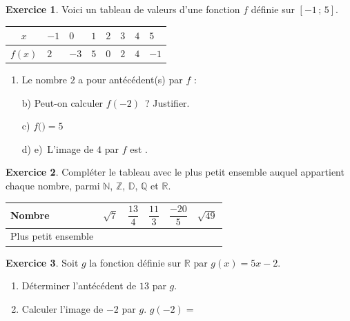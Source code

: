 \documentclass[12pt]{exam}
\theoremstyle{definition}
\newtheorem{exercice}{Exercice}
\newcommand{\pt}[1][2.5cm]{\makebox[#1]{\dotfill}}
\newcommand{\entete}[2]{%
\noindent{%
\textbf{\Niveau}\hfill\textbf{\Chapitre}\hfill\textbf{\Document\ (#1) -- #2}%
}\par
}
\begin{document}
\entete{C}{15 min}
\vspace{2mm}
\vspace{3mm}
\begin{exercice}
Voici un tableau de valeurs d'une fonction $f$ définie sur $[-1\,;\,5]$.
\begin{center}
\renewcommand{\arraystretch}{1.6}
\begin{tabular}{|c|*{7}{C{1.2cm}|}}
\hline
$x$ & $-1$ & $0$ & $1$ & $2$ & $3$ & $4$ & $5$ \\ \hline
$f(x)$ & $2$ & $-3$ & $5$ & $0$ & $2$ & $4$ & $-1$ \\ \hline
\end{tabular}
\end{center}
\begin{enumerate}[label=\alph*), itemsep=1.2em, topsep=0.6em]
\item Le nombre $2$ a pour antécédent(s) par $f$ : \pt[5cm]
\item[b)] Peut-on calculer $f(-2)$~? Justifier. \pt[9cm]
\item[c)] $f($\pt[1.5cm]$) = 5$
\item[d)] \makebox[0.5\linewidth][l]{$f(0) = $ \pt}e)~L'image de $4$ par $f$ est \pt.
\end{enumerate}
\end{exercice}

\vfill
\begin{exercice}
Compléter le tableau avec le plus petit ensemble auquel appartient chaque nombre, parmi $\mathbb{N}$, $\mathbb{Z}$, $\mathbb{D}$, $\mathbb{Q}$ et $\mathbb{R}$.
\begin{center}
\begin{tabular}{|T{4cm}|*{5}{T{2cm}|}}
\hline
Nombre & $\sqrt{7}$ & $\dfrac{13}{4}$ & $\dfrac{11}{3}$ & $\dfrac{-20}{5}$ & $\sqrt{49}$ \\ \hline
Plus petit ensemble &  &  &  &  &  \\ \hline
\end{tabular}
\end{center}
\end{exercice}

\vfill
\begin{exercice}
Soit $g$ la fonction définie sur $\mathbb{R}$ par $g(x) = 5x-2$.
\begin{enumerate}[label=\arabic*., itemsep=1.2em, topsep=0.6em]
\item Déterminer l'antécédent de $13$ par $g$.

\item Calculer l'image de $-2$ par $g$. \hfill $g(-2)=$ \pt[4cm] \hspace*{1cm}
\end{enumerate}
\end{exercice}
\end{document}
